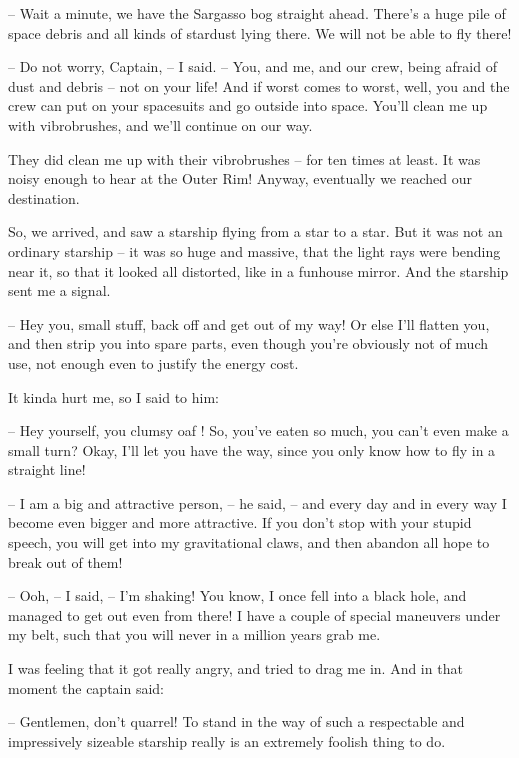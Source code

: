 \documentclass[ebook,oneside,final,openright]{memoir}
\begin{document}
– Wait a minute, we have the Sargasso bog straight ahead. There’s a huge pile of space debris and all kinds of stardust lying there. We will not be able to fly there!\par
– Do not worry, Captain, – I said. – You, and me, and our crew, being afraid of dust and debris – not on your life! And if worst comes to worst, well, you and the crew can put on your spacesuits and go outside into space. You’ll clean me up with vibrobrushes, and we’ll continue on our way.\par
\par
They did clean me up with their vibrobrushes – for ten times at least. It was noisy enough to hear at the Outer Rim! Anyway, eventually we reached our destination.\par
\par
So, we arrived, and saw a starship flying from a star to a star. But it was not an ordinary starship – it was so huge and massive, that the light rays were bending near it, so that it looked all distorted, like in a funhouse mirror. And the starship sent me a signal.\par
– Hey you, small stuff, back off and get out of my way! Or else I’ll flatten you, and then strip you into spare parts, even though you’re obviously not of much use, not enough even to justify the energy cost.\par
It kinda hurt me, so I said to him:\par
– Hey yourself, you clumsy oaf ! So, you’ve eaten so much, you can’t even make a small turn? Okay, I’ll let you have the way, since you only know how to fly in a straight line!\par
– I am a big and attractive person, – he said, – and every day and in every way I become even bigger and more attractive. If you don’t stop with your stupid speech, you will get into my gravitational claws, and then abandon all hope to break out of them!\par
– Ooh, – I said, – I’m shaking! You know, I once fell into a black hole, and managed to get out even from there! I have a couple of special maneuvers under my belt, such that you will never in a million years grab me.\par
\par
I was feeling that it got really angry, and tried to drag me in. And in that moment the captain said:\par
– Gentlemen, don’t quarrel! To stand in the way of such a respectable and impressively sizeable starship really is an extremely foolish thing to do.\par
\end{document}
